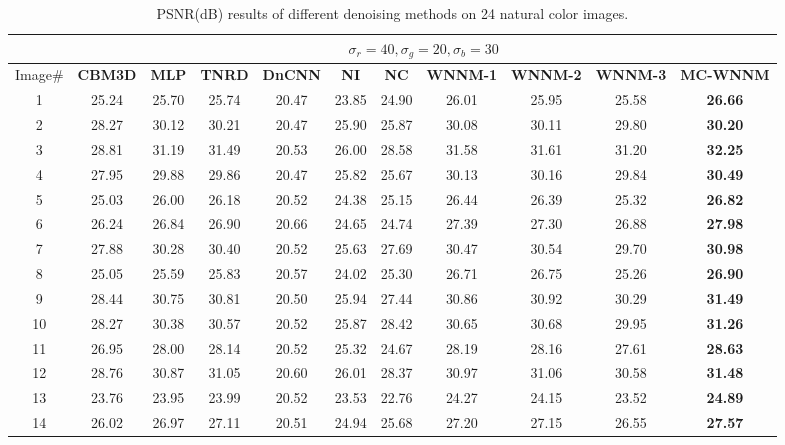 \begin{table}
\caption{PSNR(dB) results of different denoising methods on 24 natural color images.}
\label{t1}
\label{taba}
\begin{center}
\renewcommand\arraystretch{1.0}
\scriptsize
\begin{tabular}{|c||c|c|c|c|c|c|c|c|c|c|}
\hline
&\multicolumn{10}{c|}{ $\sigma_{r} = 40, \sigma_{g} = 20, \sigma_{b} = 30$}
\\
\hline
\hline
Image\#
&
\textbf{CBM3D}
&
\textbf{MLP}
&
\textbf{TNRD}
&
\textbf{DnCNN}
&
\textbf{NI}
&
\textbf{NC}
&
\textbf{WNNM-1}
&
\textbf{WNNM-2}
&
\textbf{WNNM-3}
&
\textbf{MC-WNNM}
\\
\hline
1& 25.24 & 25.70 & 25.74 & 20.47 & 23.85 & 24.90 & 26.01 & 25.95 & 25.58 & \textbf{26.66}
\\
\hline
2& 28.27 & 30.12 & 30.21 & 20.47 & 25.90 & 25.87 & 30.08 & 30.11 & 29.80 & \textbf{30.20} 
\\
\hline
3& 28.81 & 31.19 & 31.49 & 20.53 & 26.00 & 28.58 & 31.58 & 31.61 & 31.20 & \textbf{32.25}  
\\
\hline 
4& 27.95 & 29.88 & 29.86 & 20.47 & 25.82 & 25.67 & 30.13 & 30.16 & 29.84 & \textbf{30.49} 
\\
\hline
5& 25.03 & 26.00 & 26.18 & 20.52 & 24.38 & 25.15 & 26.44 & 26.39 & 25.32 & \textbf{26.82}
\\
\hline
6& 26.24 & 26.84 & 26.90 & 20.66 & 24.65 & 24.74 & 27.39 & 27.30 & 26.88 & \textbf{27.98} 
\\
\hline
7& 27.88 & 30.28 & 30.40 & 20.52 & 25.63 & 27.69 & 30.47 & 30.54 & 29.70 & \textbf{30.98} 
\\
\hline
8& 25.05 & 25.59 & 25.83 & 20.57 & 24.02 & 25.30 & 26.71 & 26.75 & 25.26 & \textbf{26.90}
\\
\hline
9& 28.44 & 30.75 & 30.81 & 20.50 & 25.94 & 27.44 & 30.86 & 30.92 & 30.29 & \textbf{31.49}
\\
\hline
10& 28.27 & 30.38 & 30.57 & 20.52 & 25.87 & 28.42 & 30.65 & 30.68 & 29.95 & \textbf{31.26}
\\
\hline
11& 26.95 & 28.00 & 28.14 & 20.52 & 25.32 & 24.67 & 28.19 & 28.16 & 27.61 & \textbf{28.63}
\\
\hline
12& 28.76 & 30.87 & 31.05 & 20.60 & 26.01 & 28.37 & 30.97 & 31.06 & 30.58 & \textbf{31.48}
\\
\hline
13& 23.76 & 23.95 & 23.99 & 20.52 & 23.53 & 22.76 & 24.27 & 24.15 & 23.52 & \textbf{24.89}
\\
\hline
14& 26.02 & 26.97 & 27.11 & 20.51 & 24.94  & 25.68 & 27.20 & 27.15 & 26.55 & \textbf{27.57}

\end{tabular}
\end{center}
\end{table}
